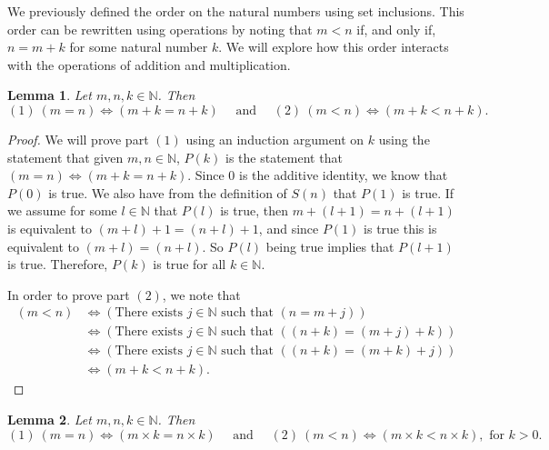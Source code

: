 \documentclass[
]{book}
\newtheorem{lemma}{Lemma}[chapter]
\theoremstyle{definition}
\theoremstyle{definition}
\theoremstyle{definition}
\theoremstyle{remark}
\begin{document}
We previously defined the order on the natural numbers using set inclusions. This order can be rewritten using operations by noting that \(m<n\) if, and only if, \(n=m+k\) for some natural number \(k\). We will explore how this order interacts with the operations of addition and multiplication.

\begin{lemma}
\protect\hypertarget{lem:order-addition-naturals}{}{\label{lem:order-addition-naturals} }Let \(m,n,k\in \mathbb{N}\). Then \[ (1) \: (m=n) \Leftrightarrow (m+k=n+k) \quad \mbox{ and } \quad (2) \: (m<n) \Leftrightarrow (m+k<n+k).\]
\end{lemma}

\begin{proof}
{}We will prove part \((1)\) using an induction argument on \(k\) using the statement that given \(m,n\in \mathbb{N}\), \(P(k)\) is the statement that \((m=n) \Leftrightarrow (m+k=n+k)\). Since \(0\) is the additive identity, we know that \(P(0)\) is true. We also have from the definition of \(S(n)\) that \(P(1)\) is true. If we assume for some \(l\in \mathbb{N}\) that \(P(l)\) is true, then \(m+(l+1) = n+(l+1)\) is equivalent to \((m+l)+1 = (n+l)+1\), and since \(P(1)\) is true this is equivalent to \((m+l)=(n+l)\). So \(P(l)\) being true implies that \(P(l+1)\) is true. Therefore, \(P(k)\) is true for all \(k\in \mathbb{N}\).

In order to prove part \((2)\), we note that
\begin{align*}
    (m<n) &\Leftrightarrow (\mbox{There exists } j\in \mathbb{N} \mbox{ such that } (n=m+j)) \\
    &\Leftrightarrow (\mbox{There exists } j\in \mathbb{N} \mbox{ such that } ((n+k)=(m+j)+k)) \\
    &\Leftrightarrow (\mbox{There exists } j\in \mathbb{N} \mbox{ such that } ((n+k)=(m+k)+j)) \\
    &\Leftrightarrow (m+k<n+k).        
\end{align*}
\end{proof}

\begin{lemma}
\protect\hypertarget{lem:order-multiplication-naturals}{}{\label{lem:order-multiplication-naturals} }Let \(m,n,k\in \mathbb{N}\). Then \[ (1) \: (m=n) \Leftrightarrow (m\times k=n\times k) \quad \mbox{ and } \quad (2) \: (m<n) \Leftrightarrow (m\times k<n\times k), \mbox{ for } k>0.\]
\end{lemma}
\end{document}
